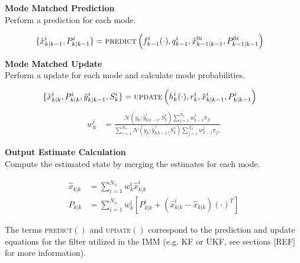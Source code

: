 \textbf{Mode Matched Prediction}\\
Perform a prediction for each mode. 

\begin{equation}
    \begin{split}
         \{\hat{x}_{k|k-1}^{i}, P_{k|k-1}^{i}\} &= \textsc{predict}\left(f_{k-1}^{i}(\cdot), q_{k-1}^{i}, \hat{x}_{k-1|k-1}^{0i}, P_{k-1|k-1}^{0i}\right)
    \end{split}
\end{equation}

\textbf{Mode Matched Update}\\
Perform a update for each mode and calculate mode probabilities.

\begin{equation}
    \begin{split}
         \{\hat{x}_{k|k}^{i}, P_{k|k}^{i}, \hat{y}_{k|k-1}^{i}, S_{k}^{i}\} &= \textsc{update}\left(h_{k}^{i}(\cdot), r_{k}^{i}, \hat{x}_{k|k-1}^{i}, P_{k|k-1}^{i}\right) 
     \end{split}
\end{equation}
\begin{equation}
    \begin{split}
         w_{k}^{i} &= \frac{\mathcal{N}(y_k;\hat{y}_{k|k-1}^{i}, S_k^{i})\sum_{j=1}^{N_{\lambda}}w_{k-1}^{j}\pi_{ji}}{\sum_{\gamma = 1}^{N_{\lambda}}\mathcal{N}(y_k;\hat{y}_{k|k-1}^{\gamma}, S_k^{\gamma})\sum_{j=1}^{N_{\lambda}}w_{k-1}^{j}\pi_{j\gamma}}
    \end{split}
\end{equation}

\textbf{Output Estimate Calculation}\\
Compute the estimated state by merging the estimates for each mode.

\begin{equation}
    \begin{split}
        \hat{x}_{k|k} &= \sum\limits_{i=1}^{N_{\lambda}}w_{k}^{i}\hat{x}_{k|k}^{i} \\
        P_{k|k} &= \sum\limits_{i=1}^{N_{\lambda}}w_{k}^{i}\left[P_{k|k}^{i} + (\hat{x}_{k|k}^{i}-\hat{x}_{k|k})(\cdot)^{T}\right]
    \end{split}
\end{equation}

The terms \textsc{predict}$()$ and \textsc{update}$()$ correspond to the prediction and update equations for the filter utilized in the IMM (e.g. KF or UKF, see sections [REF] for more information).


